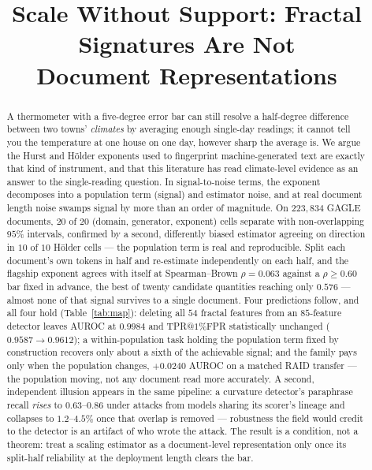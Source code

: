 \documentclass{article}
\title{Scale Without Support: Fractal Signatures Are Not\\
Document Representations}
\author{}
\begin{document}
\maketitle

\begin{abstract}
A thermometer with a five-degree error bar can still resolve a half-degree
difference between two towns' \emph{climates} by averaging enough
single-day readings; it cannot tell you the temperature at one house on one
day, however sharp the average is. We argue the Hurst and H\"older
exponents used to fingerprint machine-generated text are exactly that kind
of instrument, and that this literature has read climate-level evidence as
an answer to the single-reading question. In signal-to-noise terms, the
exponent decomposes into a population term (signal) and estimator noise,
and at real document length noise swamps signal by more than an order of
magnitude. On $223{,}834$ GAGLE documents, $20$ of $20$ (domain, generator,
exponent) cells separate with non-overlapping $95\%$ intervals, confirmed
by a second, differently biased estimator agreeing on direction in $10$ of
$10$ H\"older cells --- the population term is real and reproducible.
Split each document's own tokens in half and re-estimate independently on
each half, and the flagship exponent agrees with itself at Spearman--Brown
$\rho=0.063$ against a $\rho\ge0.60$ bar fixed in advance, the best of
twenty candidate quantities reaching only $0.576$ --- almost none of that
signal survives to a single document. Four predictions follow, and all four
hold (Table~\ref{tab:map}): deleting all $54$ fractal features from an
$85$-feature detector leaves AUROC at $0.9984$ and TPR@$1\%$FPR
statistically unchanged ($0.9587\!\to\!0.9612$); a within-population task
holding the population term fixed by construction recovers only about a
sixth of the achievable signal; and the family pays only when the
population changes, $+0.0240$ AUROC on a matched RAID transfer --- the
population moving, not any document read more accurately. A second,
independent illusion appears in the same pipeline: a curvature detector's
paraphrase recall \emph{rises} to $0.63$--$0.86$ under attacks from models
sharing its scorer's lineage and collapses to $1.2$--$4.5\%$ once that
overlap is removed --- robustness the field would credit to the detector is
an artifact of who wrote the attack. The result is a condition, not a
theorem: treat a scaling estimator as a document-level representation only
once its split-half reliability at the deployment length clears the bar.
\end{abstract}
\end{document}
